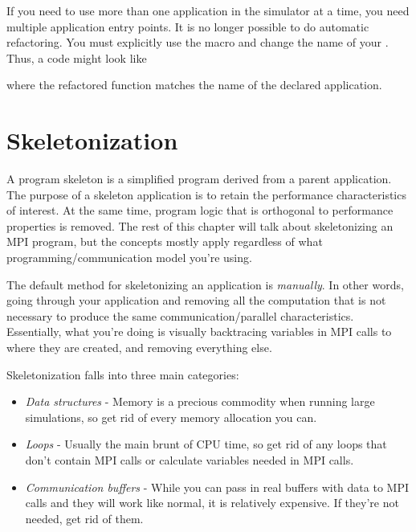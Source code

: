 If you need to use more than one application in the simulator at a time, you need multiple application entry points.
It is no longer possible to do automatic refactoring.  You must explicitly use the macro 
and change the name of your .  Thus, a code might look like

\begin{CppCode}
sstmac_register_app(my_app);

int my_app_main(int argc, char** argv)
{
...
\end{CppCode}
where the refactored  function matches the name of the declared application.


\section{Skeletonization}

A program skeleton is a simplified program derived from a parent application. The purpose of a skeleton application is to retain the performance characteristics of interest. At the same time, program logic that is orthogonal to performance properties is removed.  The rest of this chapter will talk about skeletonizing an MPI program, but the concepts mostly apply regardless of what programming/communication model you're using. 

The default method for skeletonizing an application is \textit{manually}. In other words, going through your application and removing all the computation that is not necessary to produce the same communication/parallel characteristics.   Essentially, what you're doing is visually backtracing variables in MPI calls to where they are created, and removing everything else.  

Skeletonization falls into three main categories:

\begin{itemize}
\item \textit{Data structures} - Memory is a precious commodity when running large simulations, so get rid of every memory allocation you can.
\item \textit{Loops} - Usually the main brunt of CPU time, so get rid of any loops that don't contain MPI calls or calculate variables needed in MPI calls.
\item \textit{Communication buffers} - While you can pass in real buffers with data to \sstmacro MPI calls and they will work like normal, it is relatively expensive. If they're not needed, get rid of them.
\end{itemize}

